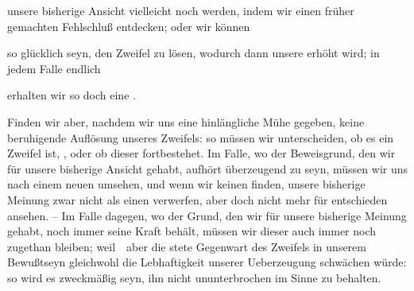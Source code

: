 \begin{aufza}
\begin{aufzb}
\item unsere bisherige Ansicht vielleicht noch  werden, indem wir einen früher gemachten Fehlschluß entdecken; oder wir können
\item so glücklich seyn, den Zweifel zu lösen, wodurch dann unsere  erhöht wird; in jedem Falle endlich
\item erhalten wir so doch eine .
\end{aufzb}
\item Finden wir aber, nachdem wir uns eine hinlängliche Mühe gegeben, keine beruhigende Auflösung unseres Zweifels: so müssen wir unterscheiden, ob es ein Zweifel ist, , oder ob dieser fortbestehet. Im  Falle, wo der Beweisgrund, den wir für unsere bisherige Ansicht gehabt, aufhört überzeugend zu seyn, müssen wir uns nach einem neuen umsehen, und wenn wir keinen finden, unsere bisherige Meinung zwar nicht als einen  verwerfen, aber doch nicht mehr für entschieden ansehen. -- Im  Falle dagegen, wo der Grund, den wir für unsere bisherige Meinung gehabt, noch immer seine Kraft behält, müssen wir dieser auch immer noch zugethan bleiben; weil~\ aber die stete Gegenwart des Zweifels in unserem Bewußtseyn gleichwohl die Lebhaftigkeit unserer Ueberzeugung schwächen würde: so wird es zweckmäßig seyn, ihn nicht ununterbrochen im Sinne zu behalten.
\end{aufza}

